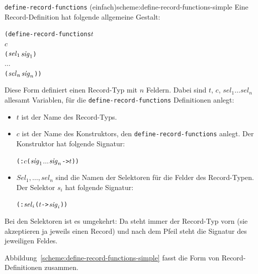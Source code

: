 \begin{feature}{\texttt{define-record-functions} (einfach)}{scheme:define-record-functions-simple}
Eine Record-Definition
hat folgende allgemeine Gestalt:\label{def:define-record-functions}
%
\begin{alltt}
(define-record-functions \(t\)
  \(c\)
  (\(\mathit{sel}\sb{1}\) \(\mathit{sig}\sb{1}\))
  \(\ldots\)
  (\(\mathit{sel}\sb{n}\) \(\mathit{sig}\sb{n}\)))
\end{alltt}
%
Diese Form definiert einen Record-Typ mit $n$ Feldern.
Dabei sind $t$, $c$, $\mathit{sel}_1 \ldots \mathit{sel}_n$ allesamt Variablen, für die
\texttt{define-record-functions} Definitionen anlegt:
%
\begin{itemize}
\item $t$ ist der Name des Record-Typs.
\item $c$ ist der Name des Konstruktors, den
  \texttt{define-record-functions} anlegt.  Der Konstruktor hat 
  folgende Signatur:
%  
\begin{alltt}
(: \(c\) (\(\mathit{sig}\sb{1}\) \(\ldots\) \(\mathit{sig}\sb{n}\) -> \(t\)))
\end{alltt}
\item $\mathit{Sel}_1, \ldots, \mathit{sel}_n$ sind die Namen der Selektoren für die Felder
  des Record-Typen.  Der Selektor $s_i$ hat folgende Signatur:
% 
\begin{alltt}
(: \(\mathit{sel}\sb{i}\) (\(t\) -> \(\mathit{sig}\sb{i}\)))
\end{alltt}
\end{itemize}
%
\end{feature}

Bei den Selektoren ist es umgekehrt: Da steht immer der Record-Typ
vorn (sie akzeptieren ja jeweils einen Record) und nach dem Pfeil
steht die Signatur des jeweiligen Feldes.

Abbildung~\ref{scheme:define-record-functions-simple} fasst die Form
von Record-Definitionen zusammen.

